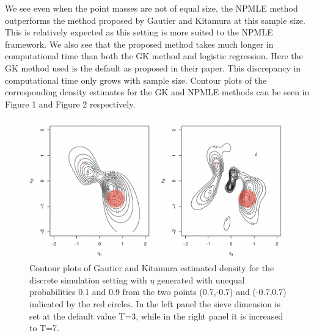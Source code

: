 \documentclass[11pt]{article}
\begin{document}
We see even when the point masses are not of equal size, the NPMLE method outperforms the method proposed by Gautier and Kitamura at this sample size. This is relatively expected as this setting is more suited to the NPMLE framework.  We also see that the proposed method takes much longer in computational time than both the GK method and logistic regression. Here the GK method used is the default as proposed in their paper. This discrepancy in computational time only grows with sample size. Contour plots of the corresponding density estimates for the GK and NPMLE methods can be seen in Figure 1 and Figure 2 respectively. 

\begin{figure}[H]
\centering
\includegraphics[scale = 0.5]{GK0_new.png}
\caption{Contour plots of Gautier and Kitamura estimated density for the discrete simulation setting with $\eta$ generated with unequal probabilities 0.1 and 0.9 from the two points  (0.7,-0.7) and (-0.7,0.7) indicated by the red circles. In the left panel the sieve dimension is set at the default value T=3, while in the right panel it is increased to T=7.}
\end{figure}
\end{document}
